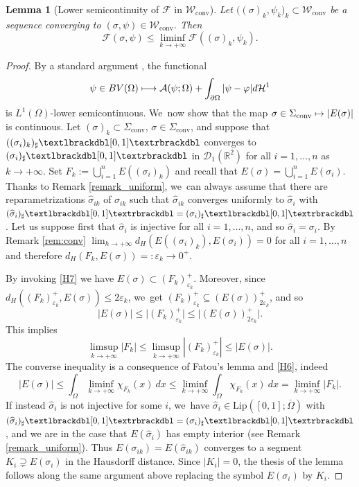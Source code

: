 \documentclass[11pt]{article}
\numberwithin{equation}{section}
\newcommand\mto{\mathchoice{\longmapsto}{\mapsto}{\mapsto}{\mapsto}}
\newcommand{\R}{\mathbb{R}}
\let\curves\Sigma
\let\eps\varepsilon
\let\Om\Omega
\newcommand\admclassconv{{\mathcal W_\mathrm{conv}}}
\newcommand\convexcurves{\curves_\mathrm{conv}}
\newcommand{\jump}[1]{\textup{\textlbrackdbl}{#1}\textup{\textrbrackdbl}}
\newcommand{\Lip}{\mathrm{Lip}}
\newtheorem{lemma}[theorem]{Lemma}
\theoremstyle{definition}
\begin{document}
\begin{lemma}[Lower semicontinuity of $\mathcal F$ in $\admclassconv$]
\label{lem:lower_semicontinuity_of_F}
Let $\big((\sigma)_k,\psi_k\big)_k\subset\admclassconv$ be a sequence converging
to $(\sigma,\psi)\in \admclassconv$. Then
\begin{equation*}
\mathcal{F}(\sigma,\psi)\le\liminf_{k\to+\infty}\mathcal{F}((\sigma)_k,\psi_k).
\end{equation*}
\end{lemma}
\begin{proof}
By a standard argument \cite{Giusti:84}, the functional
\begin{equation*}
\psi\in BV(\Om)\mto \mathcal{A}(\psi;\Om)+\int_{\partial\Om}|\psi-\varphi|d\mathcal H^1
\end{equation*}
is $L^1(\Om)$-lower semicontinuous. We~now show that the map $\sigma \in
\convexcurves
\mto|E(\sigma)|$
is continuous.
Let $(\sigma)_k \subset \convexcurves$,
$\sigma \in\convexcurves$, and suppose that
$((\sigma_{i})_k)_\sharp\jump{[0,1]}$ converges to $(\sigma_i)_\sharp\jump{[0,1]}$ in $\mathcal D_1(\R^2)$
for all $i=1,\dots,n$ as $k \to +\infty$.
Set $F_k:=\bigcup_{i=1}^n E((\sigma_{i})_k)$ and recall that
$E(\sigma)=\bigcup_{i=1}^n E(\sigma_{i})$. { Thanks to Remark \ref{remark_uniform}, we~can always assume that there are reparametrizations $\widehat\sigma_{ik}$ of $\sigma_{ik}$ such that $\widehat\sigma_{ik}$ converges uniformly to $\widehat \sigma_i$ with $(\widehat \sigma_i)_\sharp\jump{[0,1]}=(\sigma_i)_\sharp\jump{[0,1]}$. Let us suppose first that $\widehat \sigma_i$ is injective for all $i=1,\dots,n$, and so $\widehat\sigma_i=\sigma_i$.}
By Remark \ref{rem:conv}
$\lim_{h \to +\infty} d_H(E((\sigma_{i})_k),E(\sigma_i)) = 0$
for all $i=1,\dots,n$ and therefore $d_H(F_k,E(\sigma)) =: \eps_k\to 0^+$.

By invoking \ref{H7} we have $E(\sigma)\subset (F_k)^+_{\eps_k}$.
Moreover, since $d_H((F_k)_{\eps_k}^+,E(\sigma))\leq 2\eps_k$, we~get $(F_k)^+_{\eps_k}\subseteq (E(\sigma))_{2\eps_k}^+$, and so
\begin{equation*}
\vert E(\sigma)\vert\le \vert (F_k)^+_{\eps_k}\vert
\le \vert (E(\sigma))_{2\eps_k}^+\vert.
\end{equation*}
This implies
\[
\limsup_{k\to+\infty} |F_k|\leq \limsup_{k\to+\infty} |(F_k)^+_{\eps_k}|\le\mathcal |E(\sigma)|.
\]
The converse inequality is a consequence of Fatou's lemma and \ref{H6}, indeed
\[
|E(\sigma)|\leq \int_\Om\liminf_{k\to+\infty}{\chi_{F_k}(x)}~dx\leq\liminf_{k\to+\infty}\int_\Om{\chi_{F_k}(x)}~dx =\liminf_{k\to+\infty}|F_k|.
\]
If instead $\widehat\sigma_i$ is not injective for some $i$, we~have $\widehat \sigma_i\in\Lip([0,1];\overline\Om)$ with $(\widehat \sigma_i)_\sharp\jump{[0,1]}=(\sigma_i)_\sharp\jump{[0,1]}$, and we are in the case that $E(\widehat\sigma_i)$ has empty interior (see Remark \ref{remark_uniform}). Thus $ E(\sigma_{ik})=E(\widehat\sigma_{ik})$ converges to a segment $K_i\supsetneq E(\sigma_i)$ in the Hausdorff distance.
Since $|K_i|=0$, the thesis of the lemma follows along the same argument above replacing the symbol $E(\sigma_i)$ by $K_i$.
\end{proof}
\end{document}
